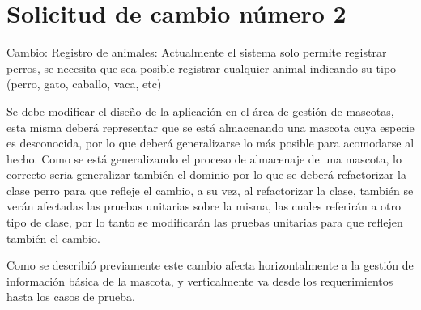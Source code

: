 \section{Solicitud de cambio número 2}

Cambio: Registro de animales: Actualmente el sistema solo permite registrar perros, se necesita que sea posible registrar cualquier animal indicando su tipo (perro, gato, caballo, vaca, etc)

Se debe modificar el diseño de la aplicación en el área de gestión de mascotas, esta misma deberá representar que se está almacenando una mascota cuya especie es desconocida, por lo que deberá generalizarse lo más posible para acomodarse al hecho. Como se está generalizando el proceso de almacenaje de una mascota, lo correcto seria generalizar también el dominio por lo que se deberá refactorizar la clase perro para que refleje el cambio, a su vez, al refactorizar la clase, también se verán afectadas las pruebas unitarias sobre la misma, las cuales referirán a otro tipo de clase, por lo tanto se modificarán las pruebas unitarias para que reflejen también el cambio.

Como se describió previamente este cambio afecta horizontalmente a la gestión de información básica de la mascota, y verticalmente va desde los requerimientos hasta los casos de prueba.

